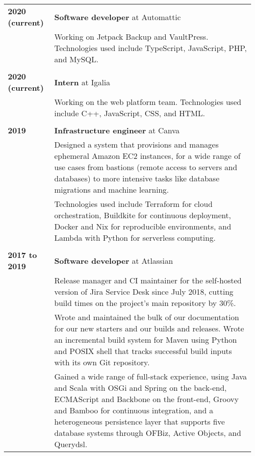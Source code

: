 \documentclass[a4paper,12pt]{article}
\begin{document}
\begin{tabular}{p{35mm}p{125mm}}
	                    \textbf{2020 (current)}     & \textbf{Software developer} at Automattic
	\vspace{0.2em}  \\                              & Working on Jetpack Backup and VaultPress. Technologies used include TypeScript, JavaScript, PHP, and MySQL.
	\\              \\  \textbf{2020 (current)}     & \textbf{Intern} at Igalia
	\vspace{0.2em}  \\                              & Working on the web platform team. Technologies used include C++, JavaScript, CSS, and HTML.
	\\              \\  \textbf{2019}               & \textbf{Infrastructure engineer} at Canva
	\vspace{0.2em}  \\                              & Designed a system that provisions and manages ephemeral Amazon EC2 instances, for a wide range of use cases from bastions (remote access to servers and databases) to more intensive tasks like database migrations and machine learning.
	\vspace{0.2em}  \\                              & Technologies used include Terraform for cloud orchestration, Buildkite for continuous deployment, Docker and Nix for reproducible environments, and Lambda with Python for serverless computing.
	\\              \\  \textbf{2017 to 2019}       & \textbf{Software developer} at Atlassian
	\vspace{0.2em}  \\                              & Release manager and CI maintainer for the self-hosted version of Jira Service Desk since July 2018, cutting build times on the project’s main repository by 30\%.
	\vspace{0.2em}  \\                              & Wrote and maintained the bulk of our documentation for our new starters and our builds and releases. Wrote an incremental build system for Maven using Python and POSIX shell that tracks successful build inputs with its own Git repository.
	\vspace{0.2em}  \\                              & Gained a wide range of full-stack experience, using Java and Scala with OSGi and Spring on the back-end, ECMAScript and Backbone on the front-end, Groovy and Bamboo for continuous integration, and a heterogeneous persistence layer that supports five database systems through OFBiz, Active Objects, and Querydsl.

\end{tabular}
\end{document}
